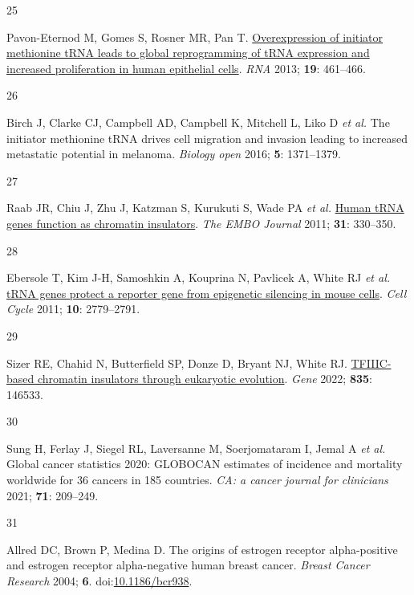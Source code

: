 \documentclass[
  11pt,
]{article}
\newlength{\cslhangindent}
\newlength{\csllabelwidth}
\newlength{\cslentryspacingunit} %
\newenvironment{CSLReferences}[2] %
 {%
  \setlength{\parindent}{0pt}
  \ifodd #1
  \let\oldpar\par
  \def\par{\hangindent=\cslhangindent\oldpar}
  \fi
  \setlength{\parskip}{#2\cslentryspacingunit}
 }%
 {}
\newcommand{\CSLLeftMargin}[1]{\parbox[t]{\csllabelwidth}{#1}}
\newcommand{\CSLRightInline}[1]{\parbox[t]{\linewidth - \csllabelwidth}{#1}\break}
\begin{document}
\begin{CSLReferences}{0}{0}
\leavevmode{}%
\CSLLeftMargin{25 }%
\CSLRightInline{Pavon-Eternod M, Gomes S, Rosner MR, Pan T. \href{https://doi.org/10.1261/rna.037507.112}{Overexpression of initiator methionine tRNA leads to global reprogramming of tRNA expression and increased proliferation in human epithelial cells}. \emph{RNA} 2013; \textbf{19}: 461--466.}

\leavevmode{}%
\CSLLeftMargin{26 }%
\CSLRightInline{Birch J, Clarke CJ, Campbell AD, Campbell K, Mitchell L, Liko D \emph{et al.} The initiator methionine {tRNA} drives cell migration and invasion leading to increased metastatic potential in melanoma. \emph{Biology open} 2016; \textbf{5}: 1371--1379.}

\leavevmode{}%
\CSLLeftMargin{27 }%
\CSLRightInline{Raab JR, Chiu J, Zhu J, Katzman S, Kurukuti S, Wade PA \emph{et al.} \href{https://doi.org/10.1038/emboj.2011.406}{Human tRNA genes function as chromatin insulators}. \emph{The EMBO Journal} 2011; \textbf{31}: 330--350.}

\leavevmode{}%
\CSLLeftMargin{28 }%
\CSLRightInline{Ebersole T, Kim J-H, Samoshkin A, Kouprina N, Pavlicek A, White RJ \emph{et al.} \href{https://doi.org/10.4161/cc.10.16.17092}{tRNA genes protect a reporter gene from epigenetic silencing in mouse cells}. \emph{Cell Cycle} 2011; \textbf{10}: 2779--2791.}

\leavevmode{}%
\CSLLeftMargin{29 }%
\CSLRightInline{Sizer RE, Chahid N, Butterfield SP, Donze D, Bryant NJ, White RJ. \href{https://doi.org/10.1016/j.gene.2022.146533}{TFIIIC-based chromatin insulators through eukaryotic evolution}. \emph{Gene} 2022; \textbf{835}: 146533.}

\leavevmode{}%
\CSLLeftMargin{30 }%
\CSLRightInline{Sung H, Ferlay J, Siegel RL, Laversanne M, Soerjomataram I, Jemal A \emph{et al.} Global cancer statistics 2020: {GLOBOCAN} estimates of incidence and mortality worldwide for 36 cancers in 185 countries. \emph{CA: a cancer journal for clinicians} 2021; \textbf{71}: 209--249.}

\leavevmode{}%
\CSLLeftMargin{31 }%
\CSLRightInline{Allred DC, Brown P, Medina D. The origins of estrogen receptor alpha-positive and estrogen receptor alpha-negative human breast cancer. \emph{Breast Cancer Research} 2004; \textbf{6}. doi:\href{https://doi.org/10.1186/bcr938}{10.1186/bcr938}.}


\end{CSLReferences}
\end{document}
